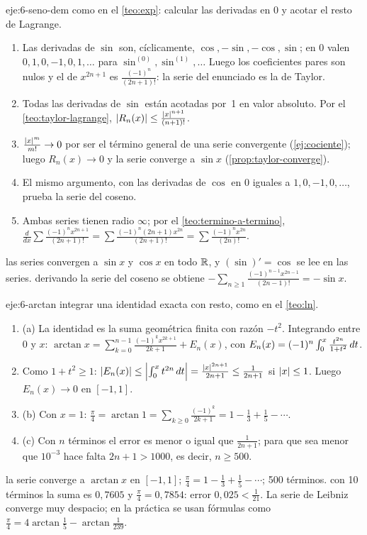 \begin{solucion}{eje:6-seno-dem}
\planteamiento como en el \cref{teo:exp}: calcular las derivadas en $0$ y acotar el resto de Lagrange.
\pasos
\begin{enumerate}[label=\arabic*.]
  \item Las derivadas de $\sin$ son, cíclicamente, $\cos,-\sin,-\cos,\sin$; en $0$ valen $0,1,0,-1,0,1,\dots$ para $\sin^{(0)},\sin^{(1)},\dots$ Luego los coeficientes pares son nulos y el de $x^{2n+1}$ es $\frac{(-1)^{n}}{(2n+1)!}$: la serie del enunciado es la de Taylor.
  \item Todas las derivadas de $\sin$ están acotadas por~1 en valor absoluto. Por el \cref{teo:taylor-lagrange}, $\lvert R_n(x)\rvert\le\frac{\lvert x\rvert^{n+1}}{(n+1)!}$.
  \item $\frac{\lvert x\rvert^{m}}{m!}\to0$ por ser el término general de una serie convergente (\cref{ej:cociente}); luego $R_n(x)\to0$ y la serie converge a $\sin x$ (\cref{prop:taylor-converge}).
  \item El mismo argumento, con las derivadas de $\cos$ en $0$ iguales a $1,0,-1,0,\dots$, prueba la serie del coseno.
  \item Ambas series tienen radio $\infty$; por el \cref{teo:termino-a-termino}, $\frac{d}{dx}\sum\frac{(-1)^{n}x^{2n+1}}{(2n+1)!}=\sum\frac{(-1)^{n}(2n+1)x^{2n}}{(2n+1)!}=\sum\frac{(-1)^{n}x^{2n}}{(2n)!}$.
\end{enumerate}
\resultado las series convergen a $\sin x$ y $\cos x$ en todo $\mathbb{R}$, y $(\sin)'=\cos$ se lee en las series.
\comprobacion derivando la serie del coseno se obtiene $-\sum_{n\ge1}\frac{(-1)^{n-1}x^{2n-1}}{(2n-1)!}=-\sin x$.
\end{solucion}

\begin{solucion}{eje:6-arctan}
\planteamiento integrar una identidad exacta con resto, como en el \cref{teo:ln}.
\pasos
\begin{enumerate}[label=\arabic*.]
  \item (a) La identidad es la suma geométrica finita con razón $-t^{2}$. Integrando entre $0$ y $x$: $\arctan x=\sum_{k=0}^{n-1}\frac{(-1)^{k}x^{2k+1}}{2k+1}+E_n(x)$, con $E_n(x)=(-1)^{n}\int_0^{x}\frac{t^{2n}}{1+t^{2}}\mathop{}\!d t$.
  \item Como $1+t^{2}\ge1$: $\lvert E_n(x)\rvert\le\Bigl|\int_0^{x}t^{2n}\mathop{}\!d t\Bigr|=\frac{\lvert x\rvert^{2n+1}}{2n+1}\le\frac{1}{2n+1}$ si $\lvert x\rvert\le1$. Luego $E_n(x)\to0$ en $[-1,1]$.
  \item (b) Con $x=1$: $\frac\pi4=\arctan1=\sum_{k\ge0}\frac{(-1)^{k}}{2k+1}=1-\frac13+\frac15-\cdots$.
  \item (c) Con $n$ términos el error es menor o igual que $\frac{1}{2n+1}$; para que sea menor que $10^{-3}$ hace falta $2n+1>1000$, es decir, $n\ge500$.
\end{enumerate}
\resultado la serie converge a $\arctan x$ en $[-1,1]$; $\frac\pi4=1-\frac13+\frac15-\cdots$; 500 términos.
\comprobacion con 10 términos la suma es $0{,}7605$ y $\frac\pi4=0{,}7854$: error $0{,}025<\frac{1}{21}$. La serie de Leibniz converge muy despacio; en la práctica se usan fórmulas como $\frac\pi4=4\arctan\frac15-\arctan\frac{1}{239}$.
\end{solucion}

